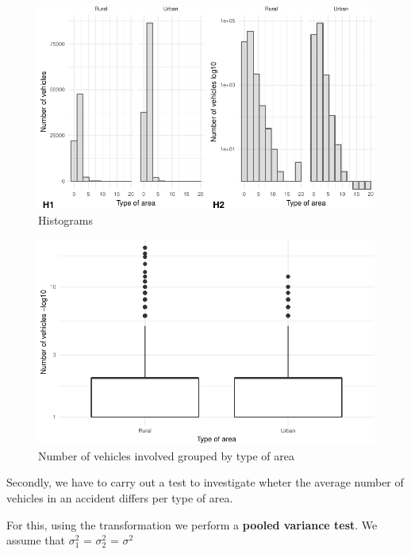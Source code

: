 \documentclass[]{article}
\begin{document}
\begin{figure}[H]

{\centering \includegraphics{READMEv2_files/figure-latex/fig-1} 

}

\caption{Histograms}\label{fig:fig}
\end{figure}

\begin{figure}[H]

{\centering \includegraphics{READMEv2_files/figure-latex/fig2-1} 

}

\caption{Number of vehicles involved grouped by type of area}\label{fig:fig2}
\end{figure}

Secondly, we have to carry out a test to investigate wheter the average
number of vehicles in an accident differs per type of area.

For this, using the transformation we perform a \textbf{pooled variance
test}. We assume that \(\sigma_{1}^{2}\) = \(\sigma_{2}^{2}\) =
\(\sigma^{2}\)
\end{document}
